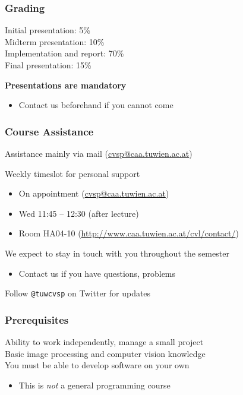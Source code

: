 \documentclass[xetex,professionalfont]{beamer}
\newcommand{\highlight}[1]{\textcolor{tuwcvl_inf_red}{\textbf{#1}}}
\begin{document}

\begin{frame}
\frametitle{Grading}

Initial presentation: 5\% \\\medskip
Midterm presentation: 10\% \\\medskip
Implementation and report: 70\% \\\medskip
Final presentation: 15\%

\bigskip
\highlight{Presentations are mandatory}
\begin{itemize}
	\item Contact us beforehand if you cannot come
\end{itemize}

\end{frame}


\begin{frame}
\frametitle{Course Assistance}

Assistance mainly via mail (\url{cvsp@caa.tuwien.ac.at})

\bigskip
Weekly timeslot for personal support
\begin{itemize}
	\item On appointment (\url{cvsp@caa.tuwien.ac.at})
	\item Wed 11:45 -- 12:30 (after lecture)
	\item Room HA04-10 (\url{http://www.caa.tuwien.ac.at/cvl/contact/})
\end{itemize}

\bigskip
We expect to stay in touch with you throughout the semester
\begin{itemize}
	\item Contact us if you have questions, problems
\end{itemize}

\bigskip
Follow \texttt{@tuwcvsp} on Twitter for updates

\end{frame}


\begin{frame}
\frametitle{Prerequisites}

Ability to work independently, manage a small project\\\medskip
Basic image processing and computer vision knowledge\\\medskip
You must be able to develop software on your own
\begin{itemize}
	\item This is \emph{not} a general programming course
\end{itemize}

\end{frame}
\end{document}

